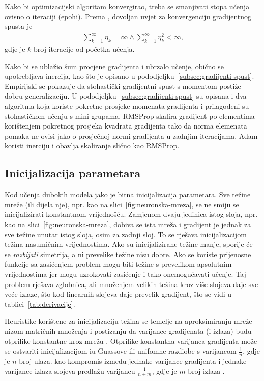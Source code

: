 \documentclass[utf8, diplomski, lmodern]{fer}
\begin{document}
Kako bi optimizacijski algoritam konvergirao, treba se smanjivati stopa učenja ovisno o iteraciji (epohi). Prema \cite{Goodfellow:2016:DL}, dovoljan uvjet za konvergenciju gradijentnog spusta je
\begin{align}
\sum_{k=1}^\infty \eta_k=\infty \wedge \sum_{k=1}^\infty \eta_k^2<\infty \text{,}
\end{align}
gdje je $k$ broj iteracije od početka učenja.

Kako bi se ublažio šum procjene gradijenta i ubrzalo učenje, obično se upotrebljava inercija, kao što je opisano u pododjeljku~\ref{subsec:gradijenti-spust}. Empirijski se pokazuje da stohastički gradijentni spust s momentom postiže dobru generalizaciju. U pododjeljku~\ref{subsec:gradijenti-spust} su opisana i dva algoritma koja koriste pokretne prosjeke momenata gradijenta i prilagođeni su stohastičkom učenju s mini-grupama. RMSProp skalira gradijent po elementima korištenjem pokretnog prosjeka kvadrata gradijenta tako da norma elemenata pomaka ne ovisi jako o prosječnoj normi gradijenta u zadnjim iteracijama. Adam koristi inerciju i obavlja skaliranje slično kao RMSProp.


\subsection{Inicijalizacija parametara}

Kod učenja dubokih modela jako je bitna inicijalizacija parametara. Sve težine mreže (ili dijela nje), npr. kao na slici~\ref{fig:neuronska-mreza}, se ne smiju se inicijalizirati konstantnom vrijednošću. Zamjenom dvaju jedinica istog sloja, npr. kao na slici~\ref{fig:neuronska-mreza}, dobiva se ista mreža i gradijent je jednak za sve težine unutar istog sloja, osim za zadnji sloj. To se rješava inicijalizacijom težina nasumičnim vrijednostima. Ako su inicijalizirane težine manje, sporije će se \textit{razbijati} simetrija, a ni prevelike težine nisu dobre. Ako se koriste prijenosne funkcije sa zasićenjem problem mogu biti težine s prevelikom apsolutnim vrijednostima jer mogu uzrokovati zasićenje i tako onemogućavati učenje. Taj problem rješava zglobnica, ali množenjem velikih težina kroz više slojeva daje sve veće izlaze, što kod linearnih slojeva daje prevelik gradijent, što se vidi u tablici~\ref{tab:derivacije}.

Heuristike korištene za inicijalizaciju težina se temelje na aproksimiranju mreže nizom matričnih množenja i postizanju da varijance gradijenata (i izlaza) budu otprilike konstantne kroz mrežu \citep{Goodfellow:2016:DL}. Otprilike konstantna varijanca gradijenta može se ostvariti inicijalizacijom iu Guassove ili unifomne razdiobe s varijancom $\frac{1}{n}$, gdje je $n$ broj ulaza. \citet{Glorot:2010:UDTDFNN} kao kompromis između jednake varijance gradijenta i jednake varijance izlaza slojeva predlažu varijancu $\frac{1}{n+m}$, gdje je $m$ broj izlaza \citep{Goodfellow:2016:DL}.
\end{document}
